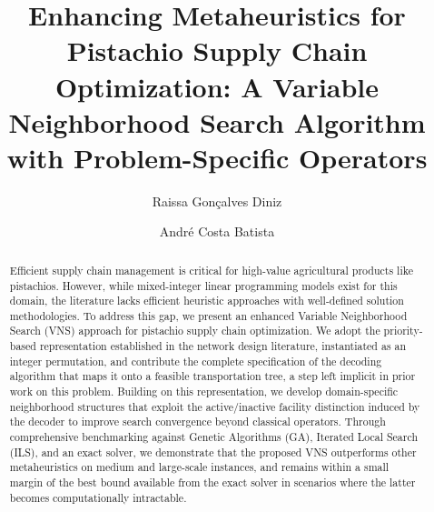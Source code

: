 \documentclass[preprint,12pt,authoryear]{elsarticle}
\begin{document}
\begin{frontmatter}

\title{Enhancing Metaheuristics for Pistachio Supply Chain Optimization: A Variable Neighborhood Search Algorithm with Problem-Specific Operators}


\author[aff1]{Raissa Gonçalves Diniz}

\author[aff1,aff2]{André Costa Batista}




\begin{abstract}
Efficient supply chain management is critical for high-value agricultural products like pistachios. However, while mixed-integer linear programming models exist for this domain, 
the literature lacks efficient heuristic approaches with well-defined solution methodologies. To address this gap, we present an enhanced Variable Neighborhood Search (VNS) approach for pistachio 
supply chain optimization. We adopt the priority-based representation established in the network design literature, instantiated as an integer permutation, and contribute the
complete specification of the decoding algorithm that maps it onto a feasible transportation tree, a step left implicit in prior work on this problem. Building on this representation,
we develop domain-specific neighborhood structures that exploit the active/inactive facility distinction induced by the decoder to improve search convergence beyond classical operators.
Through comprehensive benchmarking against Genetic Algorithms (GA), Iterated Local Search (ILS), and an exact solver, we demonstrate that the proposed VNS 
outperforms other metaheuristics on medium and large-scale instances, and remains within a small margin of the best bound available from the exact solver in scenarios where the latter becomes computationally intractable.
\end{abstract}


\end{frontmatter}
\end{document}

